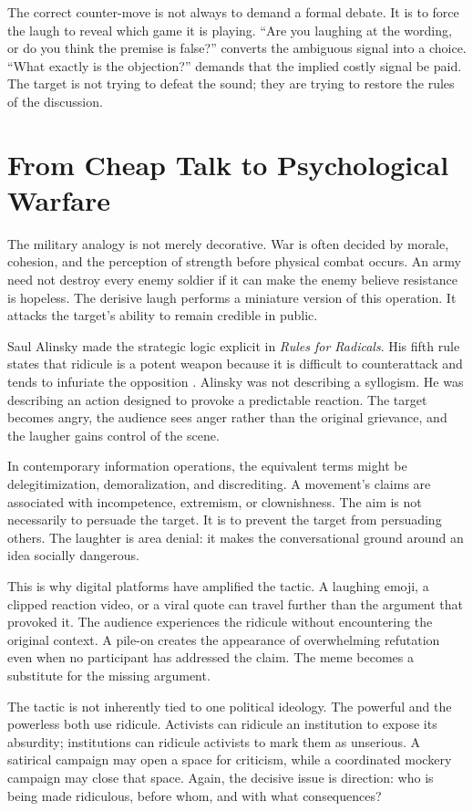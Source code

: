 ﻿\documentclass[12pt,a4paper]{book}
\begin{document}
The correct counter-move is not always to demand a formal debate. It is to force the laugh to reveal which game it is playing. ``Are you laughing at the wording, or do you think the premise is false?'' converts the ambiguous signal into a choice. ``What exactly is the objection?'' demands that the implied costly signal be paid. The target is not trying to defeat the sound; they are trying to restore the rules of the discussion.

\section{From Cheap Talk to Psychological Warfare}

The military analogy is not merely decorative. War is often decided by morale, cohesion, and the perception of strength before physical combat occurs. An army need not destroy every enemy soldier if it can make the enemy believe resistance is hopeless. The derisive laugh performs a miniature version of this operation. It attacks the target's ability to remain credible in public.

Saul Alinsky made the strategic logic explicit in \emph{Rules for Radicals}. His fifth rule states that ridicule is a potent weapon because it is difficult to counterattack and tends to infuriate the opposition \cite{alinsky1971}. Alinsky was not describing a syllogism. He was describing an action designed to provoke a predictable reaction. The target becomes angry, the audience sees anger rather than the original grievance, and the laugher gains control of the scene.

In contemporary information operations, the equivalent terms might be delegitimization, demoralization, and discrediting. A movement's claims are associated with incompetence, extremism, or clownishness. The aim is not necessarily to persuade the target. It is to prevent the target from persuading others. The laughter is area denial: it makes the conversational ground around an idea socially dangerous.

This is why digital platforms have amplified the tactic. A laughing emoji, a clipped reaction video, or a viral quote can travel further than the argument that provoked it. The audience experiences the ridicule without encountering the original context. A pile-on creates the appearance of overwhelming refutation even when no participant has addressed the claim. The meme becomes a substitute for the missing argument.

The tactic is not inherently tied to one political ideology. The powerful and the powerless both use ridicule. Activists can ridicule an institution to expose its absurdity; institutions can ridicule activists to mark them as unserious. A satirical campaign may open a space for criticism, while a coordinated mockery campaign may close that space. Again, the decisive issue is direction: who is being made ridiculous, before whom, and with what consequences?
\end{document}

